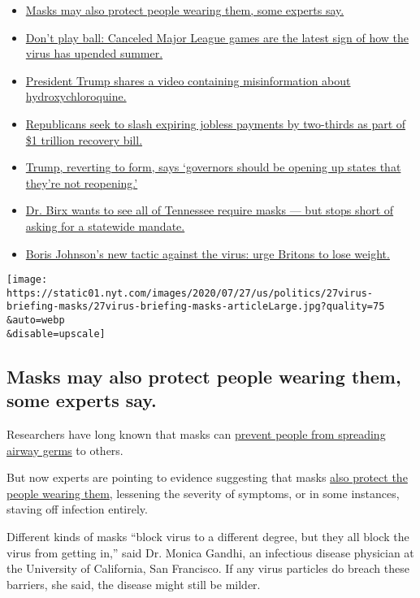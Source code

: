 \begin{itemize}
\tightlist
\item
  \protect\hyperlink{link-68280489}{Masks may also protect people
  wearing them, some experts say.}
\item
  \protect\hyperlink{link-4e079f3e}{Don't play ball: Canceled Major
  League games are the latest sign of how the virus has upended summer.}
\item
  \protect\hyperlink{link-42d380d8}{President Trump shares a video
  containing misinformation about hydroxychloroquine.}
\item
  \protect\hyperlink{link-718e6382}{Republicans seek to slash expiring
  jobless payments by two-thirds as part of \$1 trillion recovery bill.}
\item
  \protect\hyperlink{link-512ba64b}{Trump, reverting to form, says
  `governors should be opening up states that they're not reopening.'}
\item
  \protect\hyperlink{link-216a816a}{Dr. Birx wants to see all of
  Tennessee require masks --- but stops short of asking for a statewide
  mandate.}
\item
  \protect\hyperlink{link-5e8a1d38}{Boris Johnson's new tactic against
  the virus: urge Britons to lose weight.}
\end{itemize}

\texttt{[image: https://static01.nyt.com/images/2020/07/27/us/politics/27virus-briefing-masks/27virus-briefing-masks-articleLarge.jpg?quality=75\\\&auto=webp\\\&disable=upscale]}

\hypertarget{masks-may-also-protect-people-wearing-them-some-experts-say}{%
\subsection{Masks may also protect people wearing them, some experts
say.}\label{masks-may-also-protect-people-wearing-them-some-experts-say}}

Researchers have long known that masks can
\href{https://journals.plos.org/plospathogens/article?id=10.1371/journal.ppat.1003205}{prevent
people from spreading airway germs} to others.

But now experts are pointing to evidence suggesting that masks
\href{https://pubmed.ncbi.nlm.nih.gov/23498357/}{also protect the people
wearing them}, lessening the severity of symptoms, or in some instances,
staving off infection entirely.

Different kinds of masks ``block virus to a different degree, but they
all block the virus from getting in,'' said Dr. Monica Gandhi, an
infectious disease physician at the University of California, San
Francisco. If any virus particles do breach these barriers, she said,
the disease might still be milder.

